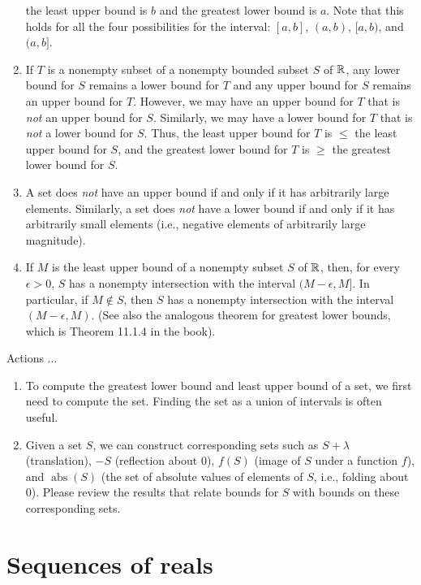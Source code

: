 \documentclass[10pt]{amsart}
\begin{document}
\begin{enumerate}
  the least upper bound is $b$ and the greatest lower bound is
  $a$. Note that this holds for all the four possibilities for the
  interval: $[a,b]$, $(a,b)$, $[a,b)$, and $(a,b]$.
\item If $T$ is a nonempty subset of a nonempty bounded subset $S$ of
  $\mathbb{R}$, any lower bound for $S$ remains a lower bound for $T$ and any
  upper bound for $S$ remains an upper bound for $T$. However, we may
  have an upper bound for $T$ that is {\em not} an upper bound for
  $S$. Similarly, we may have a lower bound for $T$ that is {\em not}
  a lower bound for $S$. Thus, the least upper bound for $T$ is $\le$
  the least upper bound for $S$, and the greatest lower bound for $T$
  is $\ge$ the greatest lower bound for $S$.
\item A set does {\em not} have an upper bound if and only if it has
  arbitrarily large elements. Similarly, a set does {\em not} have a
  lower bound if and only if it has arbitrarily small elements (i.e.,
  negative elements of arbitrarily large magnitude).
\item If $M$ is the least upper bound of a nonempty subset $S$ of
  $\mathbb{R}$, then, for every $\epsilon > 0$, $S$ has a nonempty
  intersection with the interval $(M - \epsilon,M]$. In particular, if
  $M \notin S$, then $S$ has a nonempty intersection with the interval
  $(M - \epsilon, M)$. (See also the analogous theorem for greatest
  lower bounds, which is Theorem 11.1.4 in the book).
\end{enumerate}

Actions ...

\begin{enumerate}
\item To compute the greatest lower bound and least upper bound of a
  set, we first need to compute the set. Finding the set as a union of
  intervals is often useful.
\item Given a set $S$, we can construct corresponding sets such as $S
  + \lambda$ (translation), $-S$ (reflection about $0$), $f(S)$ (image
  of $S$ under a function $f$), and $\operatorname{abs}(S)$ (the set
  of absolute values of elements of $S$, i.e., folding about
  $0$). Please review the results that relate bounds for $S$ with
  bounds on these corresponding sets.
\end{enumerate}

\section{Sequences of reals}
\end{document}
